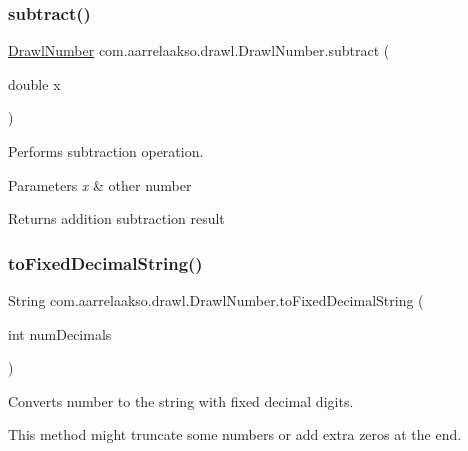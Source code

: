 \subsubsection{\texorpdfstring{subtract()}{subtract()}\hspace{0.1cm}{\footnotesize\ttfamily [3/3]}}
{\footnotesize\ttfamily \hyperlink{classcom_1_1aarrelaakso_1_1drawl_1_1_drawl_number}{Drawl\+Number} com.\+aarrelaakso.\+drawl.\+Drawl\+Number.\+subtract (\begin{DoxyParamCaption}\item[{double}]{x }\end{DoxyParamCaption})\hspace{0.3cm}{\ttfamily [protected]}}



Performs subtraction operation. 


\begin{DoxyParams}{Parameters}
{\em x} & other number \\
\hline
\end{DoxyParams}
\begin{DoxyReturn}{Returns}
addition subtraction result 
\end{DoxyReturn}
\mbox{\label{classcom_1_1aarrelaakso_1_1drawl_1_1_drawl_number_abb3852d8cebda506fbcb18f9705522ff}} 
\subsubsection{\texorpdfstring{to\+Fixed\+Decimal\+String()}{toFixedDecimalString()}}
{\footnotesize\ttfamily String com.\+aarrelaakso.\+drawl.\+Drawl\+Number.\+to\+Fixed\+Decimal\+String (\begin{DoxyParamCaption}\item[{int}]{num\+Decimals }\end{DoxyParamCaption})\hspace{0.3cm}{\ttfamily [protected]}}



Converts number to the string with fixed decimal digits. 

This method might truncate some numbers or add extra zeros at the end.


